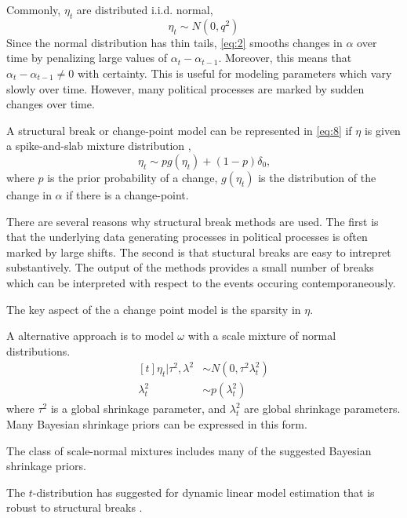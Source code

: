 \documentclass{article}
\begin{document}
Commonly, $\eta_{t}$ are distributed i.i.d. normal,
\begin{equation}
  \label{eq:2}
  \eta_{t} \sim N(0, q^{2})
\end{equation}
Since the normal distribution has thin tails, \eqref{eq:2} smooths changes in $\alpha$ over time by penalizing large values of $\alpha_{t} - \alpha_{t-1}$.
Moreover, this means that $\alpha_{t} - \alpha_{t-1} \neq 0$ with certainty.
This is useful for modeling parameters which vary slowly over time.
However, many political processes are marked by sudden changes over time.

A structural break or change-point model can be represented in \eqref{eq:8} if $\eta$ is given a spike-and-slab mixture distribution \parencite{GiordaniKohn2008},
\begin{equation}
  \label{eq:1}
  \eta_{t} \sim p g(\eta_{t}) + (1 - p) \delta_{0} \text{,}
\end{equation}
where $p$ is the prior probability of a change, $g(\eta_{t})$ is the distribution of the change in $\alpha$ if there is a change-point.

There are several reasons why structural break methods are used.
The first is that the underlying data generating processes in political processes is often marked by large shifts.
The second is that stuctural breaks are easy to intrepret substantively.
The output of the methods provides a small number of breaks which can be interpreted with respect to the events occuring contemporaneously.

The key aspect of the a change point model is the sparsity in $\eta$.

A alternative approach is to model $\omega$ with a scale mixture of normal distributions.
\begin{equation}
  \label{eq:6}
  \begin{aligned}[t]
    \eta_{t} | \tau^{2}, \lambda^{2} & \sim N(0, \tau^{2} \lambda_{t}^{2}) \\
    \lambda_{t}^{2} & \sim p(\lambda^{2}_{t})
  \end{aligned}
\end{equation}
where $\tau^{2}$ is a global shrinkage parameter, and $\lambda_{t}^{2}$ are global shrinkage parameters.
Many Bayesian shrinkage priors can be expressed in this form. 

The class of scale-normal mixtures includes many of the suggested Bayesian shrinkage priors.

The $t$-distribution has suggested for dynamic linear model estimation that is robust to structural breaks \parencites{HarveyKoopman2000}{PetrisPetroneEtAl2009}.
\end{document}
